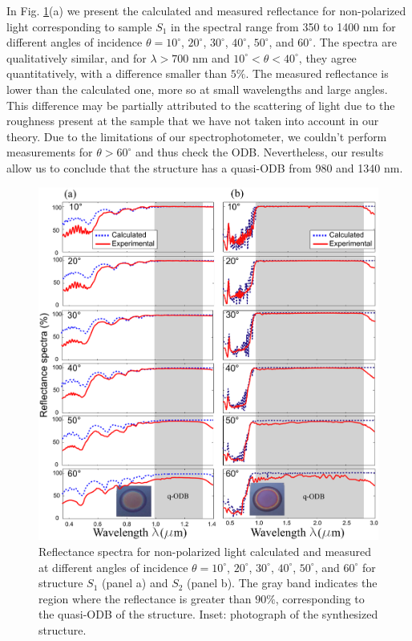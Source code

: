 \documentclass[a4paper,fleqn]{cas-sc}
\begin{document}
In Fig. \ref{Fig2}(a) we present the calculated and measured
reflectance for non-polarized light corresponding to sample $S_1$ in the spectral range from 350 to 1400
nm for different angles of
incidence $\theta=10^\circ$, $20^\circ$, $30^\circ$, $40^\circ$,
$50^\circ$, and $60^\circ$. The spectra are qualitatively
similar, and for $\lambda>700$ nm and $10^\circ < \theta <
40^\circ$, they agree quantitatively, with a difference smaller
than $5\%$.
The
measured reflectance is lower than the calculated one, more so at
small wavelengths and large angles. This difference
may be partially attributed to the scattering of light due to the
roughness present at the sample
\cite{Theiss1994,Chavez2020,Ortiz2020} that we have not taken into
account in our theory. Due to the limitations of our
spectrophotometer, we couldn't perform measurements for $\theta>60^\circ$ and thus
check the ODB. Nevertheless, our results allow us to conclude that
the structure has a quasi-ODB from 980 and
1340 nm.
\begin{figure}
  \begin{center}
    \includegraphics[width=\textwidth]{F2Alternativa.pdf}
  \end{center}
  \caption{Reflectance spectra for non-polarized light calculated and measured at different
    angles of incidence $\theta=10^\circ$, $20^\circ$, $30^\circ$,
    $40^\circ$, $50^\circ$, and $60^\circ$ for structure $S_1$
    (panel a)  and $S_2$ (panel b). The gray band indicates the
    region where the reflectance is greater than  $90\%$,
    corresponding to the quasi-ODB of the
    structure. Inset: photograph of the synthesized structure.}
  \label{Fig2}
\end{figure}
\end{document}
